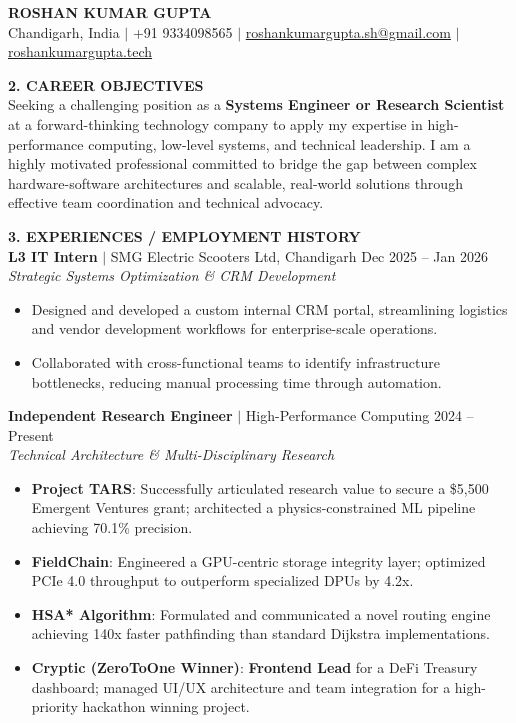 \documentclass[10pt]{article}
\newcommand{\numberedsection}[2]{\vspace{2.5mm}\noindent\textbf{\large #1. #2}\vspace{1mm}}
\begin{document}
\begin{center}
    {\huge \textbf{ROSHAN KUMAR GUPTA}} \\
    \vspace{2mm}
    Chandigarh, India $|$ +91 9334098565 $|$ \href{mailto:roshankumargupta.sh@gmail.com}{roshankumargupta.sh@gmail.com} $|$ \href{https://roshankumargupta.tech}{roshankumargupta.tech}
\end{center}

\vspace{2mm}

\numberedsection{2}{CAREER OBJECTIVES} \\
Seeking a challenging position as a \textbf{Systems Engineer or Research Scientist} at a forward-thinking technology company to apply my expertise in high-performance computing, low-level systems, and technical leadership. I am a highly motivated professional committed to bridge the gap between complex hardware-software architectures and scalable, real-world solutions through effective team coordination and technical advocacy.

\numberedsection{3}{EXPERIENCES / EMPLOYMENT HISTORY} \\
\textbf{L3 IT Intern} $|$ SMG Electric Scooters Ltd, Chandigarh \hfill Dec 2025 -- Jan 2026 \\
\textit{Strategic Systems Optimization \& CRM Development}
\begin{itemize}[noitemsep, topsep=2pt, leftmargin=15pt]
    \item Designed and developed a custom internal CRM portal, streamlining logistics and vendor development workflows for enterprise-scale operations.
    \item Collaborated with cross-functional teams to identify infrastructure bottlenecks, reducing manual processing time through automation.
\end{itemize}

\textbf{Independent Research Engineer} $|$ High-Performance Computing \hfill 2024 -- Present \\
\textit{Technical Architecture \& Multi-Disciplinary Research}
\begin{itemize}[noitemsep, topsep=2pt, leftmargin=15pt]
    \item \textbf{Project TARS}: Successfully articulated research value to secure a \$5,500 Emergent Ventures grant; architected a physics-constrained ML pipeline achieving 70.1\% precision.
    \item \textbf{FieldChain}: Engineered a GPU-centric storage integrity layer; optimized PCIe 4.0 throughput to outperform specialized DPUs by 4.2x.
    \item \textbf{HSA* Algorithm}: Formulated and communicated a novel routing engine achieving 140x faster pathfinding than standard Dijkstra implementations.
    \item \textbf{Cryptic (ZeroToOne Winner)}: \textbf{Frontend Lead} for a DeFi Treasury dashboard; managed UI/UX architecture and team integration for a high-priority hackathon winning project.
\end{itemize}
\end{document}
